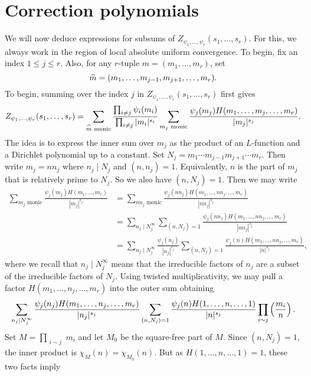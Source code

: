 \section{Correction polynomials}
    We will now deduce expressions for subsums of $Z_{\psi_{1},\ldots,\psi_{r}}(s_{1},\ldots,s_{r})$. For this, we always work in the region of local absolute uniform convergence. To begin, fix an index $1 \le j \le r$. Also, for any $r$-tuple $m = (m_{1},\ldots,m_{r})$, set
    \[
        \widehat{m} = (m_{1},\ldots,m_{j-1},m_{j+1},\ldots,m_{r}).
    \]
    To begin, summing over the index $j$ in $Z_{\psi_{1},\ldots,\psi_{r}}(s_{1},\ldots,s_{r})$ first gives
    \[
        Z_{\psi_{1},\ldots,\psi_{r}}(s_{1},\ldots,s_{r}) = \sum_{\text{$\widehat{m}$ monic}}\frac{\prod_{i \neq j}\psi_{i}(m_{i})}{\prod_{i \neq j}|m_{i}|^{s_{i}}}\sum_{\text{$m_{j}$ monic}}\frac{\psi_{j}(m_{j})H(m_{1},\ldots,m_{j},\ldots,m_{r})}{|m_{j}|^{s_{j}}}.
    \]
    The idea is to express the inner sum over $m_{j}$ as the product of an $L$-function and a Dirichlet polynomial up to a constant. Set $N_{j} = m_{1} \cdots m_{j-1}m_{j+1} \cdots m_{r}$. Then write $m_{j} = nn_{j}$ where $n_{j} \mid N_{j}$ and $(n,n_{j}) = 1$. Equivalently, $n$ is the part of $m_{j}$ that is relatively prime to $N_{j}$. So we also have $(n,N_{j}) = 1$. Then we may write
    \begin{align*}
        \sum_{\text{$m_{j}$ monic}}\frac{\psi_{j}(m_{j})H(m_{1},\ldots,m_{r})}{|m_{j}|^{s_{j}}} &= \sum_{\text{$nn_{j}$ monic}}\frac{\psi_{j}(nn_{j})H(m_{1},\ldots,nn_{j},\ldots,m_{r})}{|nn_{j}|^{s_{j}}} \\
        &= \sum_{n_{j} \mid N_{j}^{\infty}}\sum_{(n,N_{j}) = 1}\frac{\psi_{j}(nn_{j})H(m_{1},\ldots,nn_{j},\ldots,m_{r})}{|nn_{j}|^{s_{j}}} \\
        &= \sum_{n_{j} \mid N_{j}^{\infty}}\frac{\psi_{j}(n_{j})}{|n_{j}|^{s_{j}}}\sum_{(n,N_{j}) = 1}\frac{\psi_{j}(n)H(m_{1},\ldots,nn_{j},\ldots,m_{r})}{|n|^{s_{j}}},
    \end{align*}
    where we recall that $n_{j} \mid N_{j}^{\infty}$ means that the irreducible factors of $n_{j}$ are a subset of the irreducible factors of $N_{j}$. Using twisted multiplicativity, we may pull a factor $H(m_{1},\ldots,n_{j},\ldots,m_{r})$ into the outer sum obtaining
    \[
        \sum_{n_{j} \mid N_{j}^{\infty}}\frac{\psi_{j}(n_{j})H(m_{1},\ldots,n_{j},\ldots,m_{r})}{|n_{j}|^{s_{j}}}\sum_{(n,N_{j}) = 1}\frac{\psi_{j}(n)H(1,\ldots,n,\ldots,1)}{|n|^{s_{j}}}\prod_{\substack{i \sim j}}\left(\frac{m_{i}}{n}\right).
    \]
    Set $M = \prod_{\substack{i \sim j}}m_{i}$ and let $M_{0}$ be the square-free part of $M$. Since $(n,N_{j}) = 1$, the inner product is $\chi_{M}(n) = \chi_{M_{0}}(n)$. But as $H(1,\ldots,n,\ldots,1) = 1$, these two facts imply 
